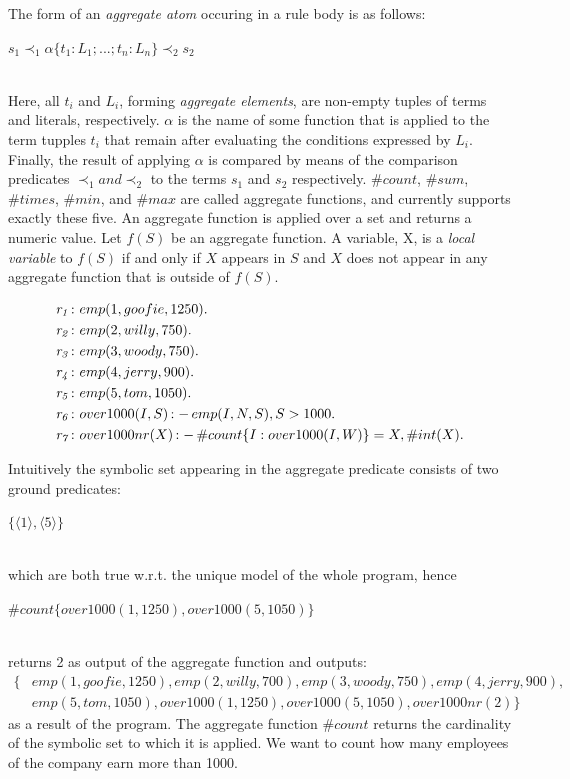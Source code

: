 \documentclass[a4paper, titlepage]{article}
\DeclareMathOperator{\leftimpl}{:-}
\newcommand{\row}[1]{%
  \ensuremath{\it \color{black} #1 \color{black}}%
}
\begin{document}
The form of an \emph{aggregate atom} occuring in a rule 
body is as follows:\\ \centerline{$s_1 \prec_1 \alpha \{ 
t_1:L_1;...;t_n:L_n\} \prec_2 s_2$} 
\\ Here, all $\mathit{t_i}$ and $\mathit{L_i}$, forming 
\emph{aggregate elements}, are non-empty tuples of terms 
and literals, respectively. $\alpha$ is the name of some 
function that is applied to the term tupples \texttt{$t_i$} 
that remain after evaluating the conditions expressed by 
$L_i$. Finally,  the result of applying $\alpha$ is 
compared by means of the comparison predicates $\prec_1 and 
\prec_2$ to the terms $s_1$ and $s_2$ respectively. 
$\mathit{\#count}$, $\mathit{\#sum}$, $\mathit{\#times}$, 
$\mathit{\#min}$, and $\mathit{\#max}$ are called aggregate 
functions, and \dlvhex{} currently supports exactly these 
five. An aggregate function is applied over a set and 
returns a numeric value. Let $f(S)$ be an aggregate 
function. A variable, X, is a \emph{local variable} to 
$f(S)$ if and only if $X$ appears in $S$ and $X$ does not 
appear in any aggregate function that is outside of $f(S)$. 
\begin{exmp}
\begin{align*}
\row{r_1}\colon& emp(1,goofie,1250).\\
\row{r_2}\colon& emp(2,willy,750).\\
\row{r_3}\colon& emp(3,woody,750).\\
\row{r_4}\colon& emp(4,jerry,900).\\
\row{r_5}\colon& emp(5,tom,1050). \\
\row{r_6}\colon& over1000(I,S) \leftimpl emp(I,N,S), S > 1000.\\
\row{r_7}\colon& over1000nr(X) \leftimpl \#count\{I : 
over1000(I,W)\} = X, \#int(X).
\end{align*}
\end{exmp}
Intuitively the symbolic set appearing in the aggregate 
predicate consists of two ground predicates: \\ 
\centerline{$\{\langle 1 \rangle,\langle 5 \rangle\}$}
\\which are both true w.r.t. the unique model of the whole 
program, hence \\ \centerline{$ 
\#count\{over1000(1,1250),over1000(5,1050)\}$} \\returns 2 
as output of the aggregate function and outputs:
\begin{align*}
\{ & \mathit{emp(1,goofie,1250),emp(2,willy,700),emp(3,woody,750),emp(4,jerry,900),}\\
& \mathit{emp(5,tom,1050),over1000(1,1250),over1000(5,1050),over1000nr(2)} \}
\end{align*}
as a result of the program.
The aggregate function $\mathit{\#count}$ returns the 
cardinality of the symbolic set to which it is applied. We 
want to count how many employees of the company earn more 
than 1000. 
\end{document}
